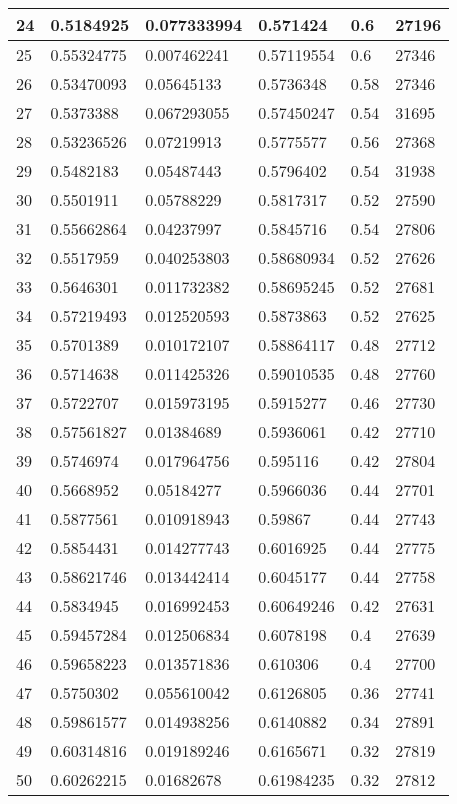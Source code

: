 \begin{longtable}{|l|l|l|l|l|l|}
24 & 0.5184925 & 0.077333994 & 0.571424 & 0.6 & 27196 \\ \hline 
25 & 0.55324775 & 0.007462241 & 0.57119554 & 0.6 & 27346 \\ \hline 
26 & 0.53470093 & 0.05645133 & 0.5736348 & 0.58 & 27346 \\ \hline 
27 & 0.5373388 & 0.067293055 & 0.57450247 & 0.54 & 31695 \\ \hline 
28 & 0.53236526 & 0.07219913 & 0.5775577 & 0.56 & 27368 \\ \hline 
29 & 0.5482183 & 0.05487443 & 0.5796402 & 0.54 & 31938 \\ \hline 
30 & 0.5501911 & 0.05788229 & 0.5817317 & 0.52 & 27590 \\ \hline 
31 & 0.55662864 & 0.04237997 & 0.5845716 & 0.54 & 27806 \\ \hline 
32 & 0.5517959 & 0.040253803 & 0.58680934 & 0.52 & 27626 \\ \hline 
33 & 0.5646301 & 0.011732382 & 0.58695245 & 0.52 & 27681 \\ \hline 
34 & 0.57219493 & 0.012520593 & 0.5873863 & 0.52 & 27625 \\ \hline 
35 & 0.5701389 & 0.010172107 & 0.58864117 & 0.48 & 27712 \\ \hline 
36 & 0.5714638 & 0.011425326 & 0.59010535 & 0.48 & 27760 \\ \hline 
37 & 0.5722707 & 0.015973195 & 0.5915277 & 0.46 & 27730 \\ \hline 
38 & 0.57561827 & 0.01384689 & 0.5936061 & 0.42 & 27710 \\ \hline 
39 & 0.5746974 & 0.017964756 & 0.595116 & 0.42 & 27804 \\ \hline 
40 & 0.5668952 & 0.05184277 & 0.5966036 & 0.44 & 27701 \\ \hline 
41 & 0.5877561 & 0.010918943 & 0.59867 & 0.44 & 27743 \\ \hline 
42 & 0.5854431 & 0.014277743 & 0.6016925 & 0.44 & 27775 \\ \hline 
43 & 0.58621746 & 0.013442414 & 0.6045177 & 0.44 & 27758 \\ \hline 
44 & 0.5834945 & 0.016992453 & 0.60649246 & 0.42 & 27631 \\ \hline 
45 & 0.59457284 & 0.012506834 & 0.6078198 & 0.4 & 27639 \\ \hline 
46 & 0.59658223 & 0.013571836 & 0.610306 & 0.4 & 27700 \\ \hline 
47 & 0.5750302 & 0.055610042 & 0.6126805 & 0.36 & 27741 \\ \hline 
48 & 0.59861577 & 0.014938256 & 0.6140882 & 0.34 & 27891 \\ \hline 
49 & 0.60314816 & 0.019189246 & 0.6165671 & 0.32 & 27819 \\ \hline 
50 & 0.60262215 & 0.01682678 & 0.61984235 & 0.32 & 27812 \\ \hline 
\end{longtable}